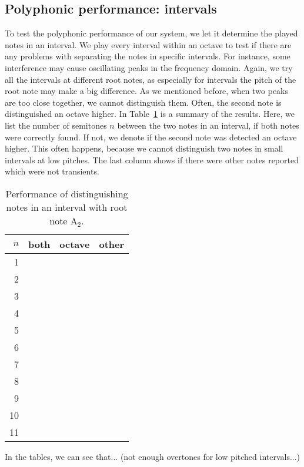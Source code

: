 \documentclass[10pt,twocolumn]{article}
\begin{document}
\subsection{Polyphonic performance: intervals}
To test the polyphonic performance of our system, we let it determine the played notes in an interval. We play every interval within an octave to test if there are any problems with separating the notes in specific intervals. For instance, some interference may cause oscillating peaks in the frequency domain. Again, we try all the intervals at different root notes, as especially for intervals the pitch of the root note may make a big difference. As we mentioned before, when two peaks are too close together, we cannot distinguish them. Often, the second note is distinguished an octave higher. In Table~\ref{tab:polperf} is a summary of the results. Here, we list the number of semitones $n$ between the two notes in an interval, if both notes were correctly found. If not, we denote if the second note was detected an octave higher. This often happens, because we cannot distinguish two notes in small intervals at low pitches. The last column shows if there were other notes reported which were not transients.
\begin{table}[H]%
    \centering
    \begin{tabular}{r|rrr}
        $n$ & both & octave & other \\
        \hline
        1  &  &  &  \\
        2  &  &  &  \\
        3  &  &  &  \\
        4  &  &  &  \\
        5  &  &  &  \\
        6  &  &  &  \\
        7  &  &  &  \\
        8  &  &  &  \\
        9  &  &  &  \\
        10 &  &  &  \\
        11 &  &  & 
    \end{tabular}
    \caption{Performance of distinguishing notes in an interval with root note $\text{A}_2$.}
    \label{tab:polperf}
\end{table}\vspace{-3mm}
In the tables, we can see that... (not enough overtones for low pitched intervals...)
\end{document}
